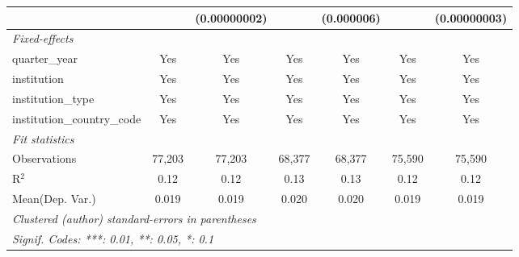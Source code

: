 \begin{tabular}{lcccccc}
                                      &              & (0.00000002)  &               & (0.000006)     &              & (0.00000003)\\   
   \midrule
   \emph{Fixed-effects}\\
   quarter\_year                      & Yes          & Yes           & Yes           & Yes            & Yes          & Yes\\  
   institution                        & Yes          & Yes           & Yes           & Yes            & Yes          & Yes\\  
   institution\_type                  & Yes          & Yes           & Yes           & Yes            & Yes          & Yes\\  
   institution\_country\_code         & Yes          & Yes           & Yes           & Yes            & Yes          & Yes\\  
   \midrule
   \emph{Fit statistics}\\
   Observations                       & 77,203       & 77,203        & 68,377        & 68,377         & 75,590       & 75,590\\  
   R$^2$                              & 0.12         & 0.12          & 0.13          & 0.13           & 0.12         & 0.12\\  
Mean(Dep. Var.) & 0.019 & 0.019 & 0.020 & 0.020 & 0.019 & 0.019 \\
   \midrule \midrule
   \multicolumn{7}{l}{\emph{Clustered (author) standard-errors in parentheses}}\\
   \multicolumn{7}{l}{\emph{Signif. Codes: ***: 0.01, **: 0.05, *: 0.1}}\\
\end{tabular}
\par\endgroup
